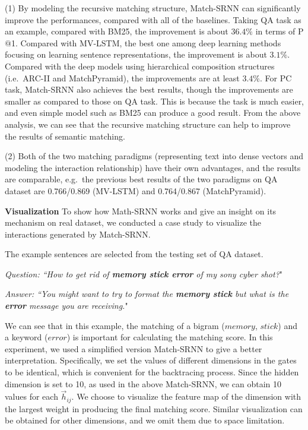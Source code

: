 (1) By modeling the recursive matching structure, Match-SRNN can significantly improve the performances, compared with all of the baselines.
Taking QA task as an example, compared with BM25, the improvement is about $36.4\%$ in terms of P$@$1. Compared with MV-LSTM, the best one among deep learning methods focusing on learning sentence representations, the improvement is about $3.1\%$. Compared with the deep models using hierarchical composition structures (i.e.~ARC-II and MatchPyramid), the improvements are at least $3.4\%$. For PC task, Match-SRNN also achieves the best results, though the improvements are smaller as compared to those on QA task. This is because the task is much easier, and even simple model such as BM25 can produce a good result. From the above analysis, we can see that the recursive matching structure can help to improve the results of semantic matching.

(2) Both of the two matching paradigms (representing text into dense vectors and modeling the interaction relationship) have their own advantages, and the results are comparable, e.g.~the previous best results of the two paradigms on QA dataset are 0.766/0.869 (MV-LSTM) and 0.764/0.867 (MatchPyramid).


\textbf{Visualization}
To show how Math-SRNN works and give an insight on its mechanism on real dataset, we conducted a case study to visualize the interactions generated by Match-SRNN.

The example sentences are selected from the testing set of QA dataset.

{\em Question: ``How to get rid of \textbf{memory stick error} of my sony cyber shot?}"

{\em Answer: ``You might want to try to format the \textbf{ memory stick} but what is the \textbf{error} message you are receiving.}"

We can see that in this example, the matching of a bigram ($memory$, $stick$) and a keyword ($error$) is important for calculating the matching score. In this experiment, we used a simplified version Match-SRNN to give a better interpretation. Specifically, we set the values of different dimensions in the gates to be identical, which is convenient for the backtracing process. Since the hidden dimension is set to 10, as used in the above Match-SRNN, we can obtain 10 values for each $\vec{h}_{ij}$. We choose to visualize the feature map of the dimension with the largest weight in producing the final matching score. Similar visualization can be obtained for other dimensions, and we omit them due to space limitation.

